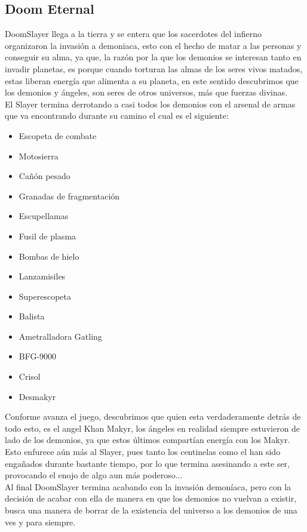 \documentclass[spanish,12pt,letterpaper]{article}
\begin{document}
\subsection{Doom Eternal}

\noindent DoomSlayer llega a la tierra y se entera que los sacerdotes del infierno organizaron la invasión a demoniaca, esto con el hecho de matar a las personas y conseguir su alma, ya que, la razón por la que los demonios se interesan tanto en invadir planetas, es porque cuando torturan las almas de los seres vivos matados, estas liberan energía que alimenta a su planeta, en este sentido descubrimos que los demonios y ángeles, son seres de otros universos, más que fuerzas divinas. \\[1mm]

\noindent El Slayer termina derrotando a casi todos los demonios con el arsenal de armas que va encontrando durante su camino el cual es el siguiente:


\begin{itemize}
    \item Escopeta de combate
    \item Motosierra
    \item Cañón pesado
    \item Granadas de fragmentación
    \item Escupellamas
    \item Fusil de plasma
    \item Bombas de hielo
    \item Lanzamisiles
    \item Superescopeta
    \item Balista
    \item Ametralladora Gatling
    \item BFG-9000
    \item Crisol
    \item Desmakyr
\end{itemize}

\noindent Conforme avanza el juego, descubrimos que quien esta verdaderamente detrás de todo esto, es el angel Khan Makyr, los ángeles en realidad siempre estuvieron de lado de los demonios, ya que estos últimos compartían energía con los Makyr. Esto enfurece aún más al Slayer, pues tanto los centinelas como el han sido engañados durante bastante tiempo, por lo que termina asesinando a este ser, provocando el enojo de algo aun más poderoso...\\[1mm]

\noindent Al final DoomSlayer termina acabando con la invasión demoníaca, pero con la decisión de acabar con ella de manera en que los demonios no vuelvan a existir, busca una manera de borrar de la existencia del universo a los demonios de una ves y para siempre.
\end{document}
